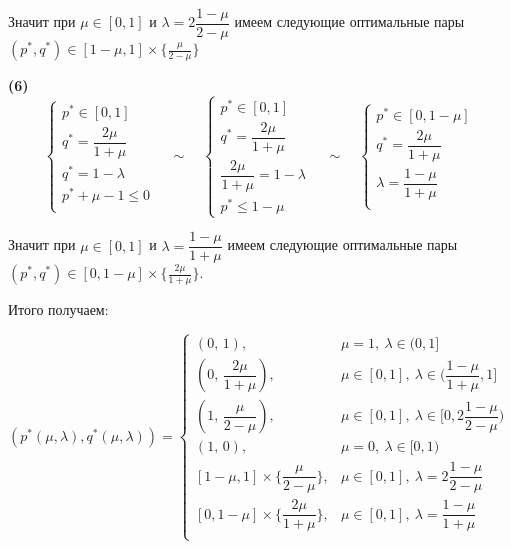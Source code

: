 Значит при $\mu \in [0, 1]$ и $\lambda = 2\dfrac{1 - \mu}{2 - \mu}$ 
имеем следующие оптимальные пары
$ (p^*, q^*) \in [1 - \mu, 1] \times  \{ \frac{\mu}{2 - \mu}\}$

\hspace{5mm}

\textbf{(6)}
$$
	\begin{cases}
		p^* \in [0, 1] \\
		q^*= \dfrac{2\mu}{1+\mu} \\
		q^* = 1 - \lambda \\
		p^* + \mu - 1 \leqslant 0 \\
	\end{cases}
	\quad \sim \quad
	\begin{cases}
		p^* \in [0, 1] \\
		q^* = \dfrac{2\mu}{1+\mu} \\
		\dfrac{2\mu}{1+\mu} = 1 - \lambda \\
		p^* \leqslant 1 - \mu 
	\end{cases}
	\quad \sim \quad
	\begin{cases}
		p^* \in [0, 1 - \mu] \\
		q^* = \dfrac{2\mu}{1+\mu} \\
		\lambda = \dfrac{1-\mu}{1+\mu} \\
	\end{cases}
$$

Значит при $\mu \in [0, 1]$ и $\lambda = \dfrac{1-\mu}{1+\mu}$
имеем следующие оптимальные пары
$(p^*, q^*) \in [0, 1 - \mu] \times \{\frac{2\mu}{1 + \mu}\}$.

\hspace{5mm}

Итого получаем:

$(p^*(\mu, \lambda), q^*(\mu, \lambda))=
\begin{cases}
	(0, \, 1), & \mu = 1, \: \lambda \in (0,1] 
	\\
	(0, \, \dfrac{2\mu}{1 + \mu}), & 
	\mu \in [0, 1], \: \lambda \in (\dfrac{1-\mu}{1+\mu}, 1]
	\\
	(1, \, \dfrac{\mu}{2 - \mu}), & 
	\mu \in [0, 1], \: \lambda \in [0, 2\dfrac{1-\mu}{2-\mu})
	\\
	(1, \, 0), & \mu=0, \: \lambda \in [0, 1)
	\\
	[1 - \mu, 1] \times  \Big\{ \dfrac{\mu}{2 - \mu}\Big\}, &
	\mu \in [0, 1], \: \lambda = 2\dfrac{1 - \mu}{2 - \mu}	
	\\
	[0, 1 - \mu] \times \Big\{\dfrac{2\mu}{1 + \mu}\Big\}, &
	\mu \in [0, 1], \: \lambda = \dfrac{1-\mu}{1+\mu}
	\\
\end{cases}
$

